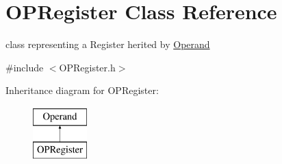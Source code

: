\hypertarget{classOPRegister}{\section{\-O\-P\-Register \-Class \-Reference}
\label{classOPRegister}
}


class representing a \-Register herited by \hyperlink{classOperand}{\-Operand}  




{\ttfamily \#include $<$\-O\-P\-Register.\-h$>$}

\-Inheritance diagram for \-O\-P\-Register\-:\begin{figure}[H]
\begin{center}
\leavevmode
\includegraphics[height=2.000000cm]{classOPRegister}
\end{center}
\end{figure}
